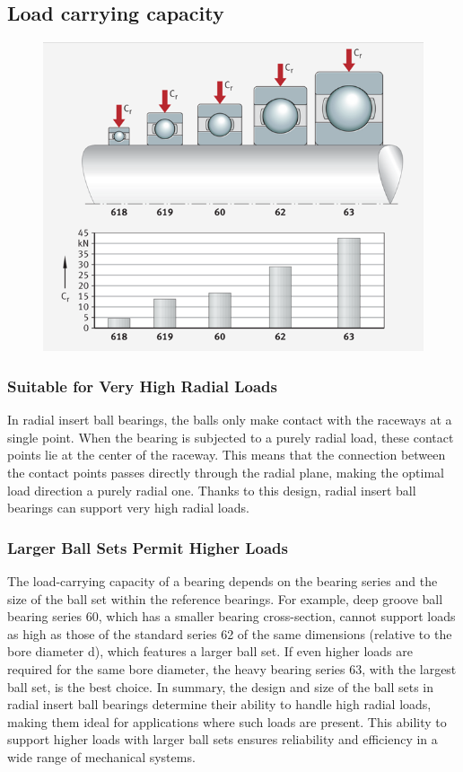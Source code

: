 \documentclass[../../main]{subfiles}
\begin{document}
\subsection{Load carrying capacity}
\begin{figure}[h!]
  \centering
  \includegraphics[width=\textwidth]{img/Picture5.png}
  \caption{}
  \end{figure}

\subsubsection{Suitable for Very High Radial Loads}
In radial insert ball bearings, the balls only make contact with the raceways at a single point. When the bearing is subjected to a purely radial load, these contact points lie at the center of the raceway. This means that the connection between the contact points passes directly through the radial plane, making the optimal load direction a purely radial one. Thanks to this design, radial insert ball bearings can support very high radial loads.

\subsubsection{Larger Ball Sets Permit Higher Loads}

The load-carrying capacity of a bearing depends on the bearing series and the size of the ball set within the reference bearings. For example, deep groove ball bearing series 60, which has a smaller bearing cross-section, cannot support loads as high as those of the standard series 62 of the same dimensions (relative to the bore diameter d), which features a larger ball set. If even higher loads are required for the same bore diameter, the heavy bearing series 63, with the largest ball set, is the best choice.
In summary, the design and size of the ball sets in radial insert ball bearings determine their ability to handle high radial loads, making them ideal for applications where such loads are present. This ability to support higher loads with larger ball sets ensures reliability and efficiency in a wide range of mechanical systems.
\end{document}
